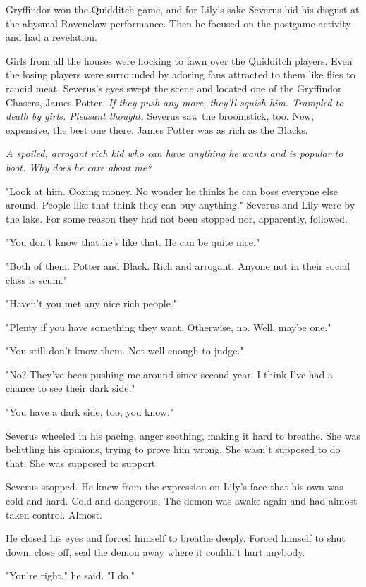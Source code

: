 Gryffindor won the Quidditch game, and for Lily's sake Severus hid his disgust at the abysmal Ravenclaw performance. Then he focused on the postgame activity and had a revelation.

Girls from all the houses were flocking to fawn over the Quidditch players. Even the losing players were surrounded by adoring fans attracted to them like flies to rancid meat. Severus's eyes swept the scene and located one of the Gryffindor Chasers, James Potter. \emph{If they push any more, they'll squish him. Trampled to death by girls. Pleasant thought.} Severus saw the broomstick, too. New, expensive, the best one there. James Potter was as rich as the Blacks.

\emph{A spoiled, arrogant rich kid who can have anything he wants and is popular to boot. Why does he care about me?}

"Look at him. Oozing money. No wonder he thinks he can boss everyone else around. People like that think they can buy anything." Severus and Lily were by the lake. For some reason they had not been stopped nor, apparently, followed.

"You don't know that he's like that. He can be quite nice."

"Both of them. Potter and Black. Rich and arrogant. Anyone not in their social class is scum."

"Haven't you met any nice rich people."

"Plenty if you have something they want. Otherwise, no. Well, maybe one."

"You still don't know them. Not well enough to judge."

"No? They've been pushing me around since second year. I think I've had a chance to see their dark side."

"You have a dark side, too, you know."

Severus wheeled in his pacing, anger seething, making it hard to breathe. She was belittling his opinions, trying to prove him wrong. She wasn't supposed to do that. She was supposed to support{\el}

Severus stopped. He knew from the expression on Lily's face that his own was cold and hard. Cold and dangerous. The demon was awake again and had almost taken control. Almost.

He closed his eyes and forced himself to breathe deeply. Forced himself to shut down, close off, seal the demon away where it couldn't hurt anybody.

"You're right," he said. "I do."

